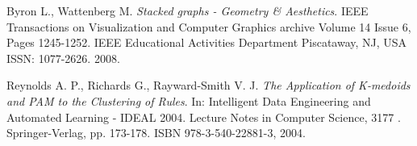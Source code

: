 \documentclass[journal]{vgtc}                %
\begin{document}
\begin{thebibliography}{9}

  Byron L., Wattenberg M.
  \emph{Stacked graphs - Geometry \& Aesthetics}.
  IEEE Transactions on Visualization and Computer Graphics archive
Volume 14 Issue 6,
Pages 1245-1252. IEEE Educational Activities Department Piscataway, NJ, USA
ISSN: 1077-2626.
  2008.

  Reynolds A. P., Richards G., Rayward-Smith V. J.
  \emph{The Application of K-medoids and PAM to the Clustering of Rules}.
  In: Intelligent Data Engineering and Automated Learning - IDEAL 2004. Lecture Notes in Computer Science, 3177 . Springer-Verlag, pp. 173-178. ISBN 978-3-540-22881-3,
  2004.

\end{thebibliography}
\end{document}
